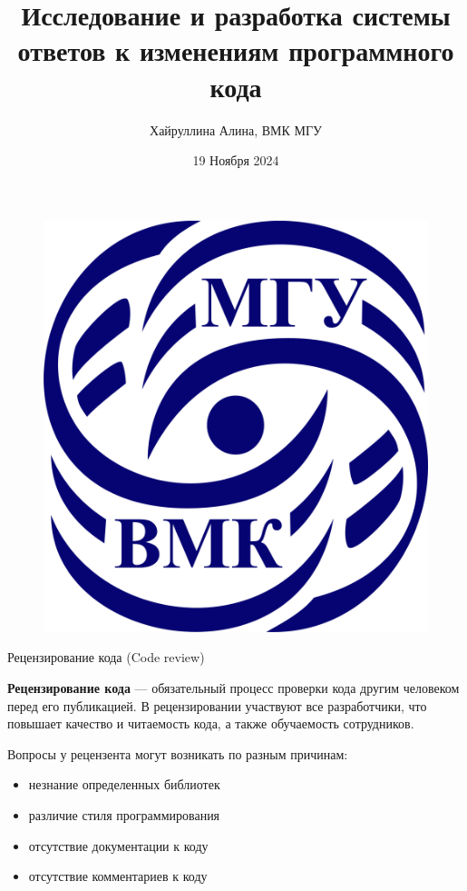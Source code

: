 \documentclass[aspectratio=169, fontsize=18pt]{beamer}
\begin{document}
\title{Исследование и разработка системы ответов к изменениям программного кода}

\author{Хайруллина Алина, ВМК МГУ\\
  }

\date{19 Ноября 2024}

\begin{frame}
\titlepage

    \begin{figure}[htpb]
        \begin{center}
            \includegraphics[keepaspectratio, scale=0.08]{png/logo_vmk.png}
        \end{center}
    \end{figure}
\end{frame}

\begin{frame}{Рецензирование кода (Code review)}

\textbf{Рецензирование кода} — обязательный процесс проверки кода другим
человеком перед его публикацией. В рецензировании участвуют все
разработчики, что повышает качество и читаемость кода, а также
обучаемость сотрудников.

\begin{block}{Вопросы у рецензента могут возникать по разным причинам:}
    \begin{itemize}
			\item {незнание определенных библиотек}
			\item различие стиля программирования
			\item отсутствие документации к коду
                \item отсутствие комментариев к коду
\end{itemize}
\end{block}
\end{frame}
\end{document}
